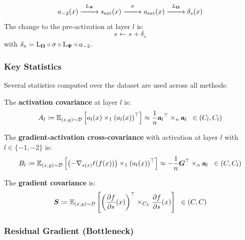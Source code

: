 \[
a_{- 2}(x) \overset{L_{\boldsymbol{\Psi}{}}}{\xrightarrow{\hspace{2em}}} s_{\text{ext}}(x) \overset{\sigma}{\xrightarrow{\hspace{2em}}} a_{\text{ext}}(x) \overset{L_{\boldsymbol{\Omega}{}}}{\xrightarrow{\hspace{2em}}} \delta_s(x)
\]
The change to the pre-activation at layer \(l\) is:
\[s_{} \leftarrow s_{} + \delta_{s_{}}\] with
\(\delta_{s_{}} = \mathrm{L}_{\boldsymbol{\Omega}{}} \circ \sigma \circ \mathrm{L}_{\boldsymbol{\Psi}{}} \circ a_{- 2}\).

\subsubsection{Key Statistics}

Several statistics computed over the dataset are used across all
methods:

\begin{definition}

The \textbf{activation covariance} at layer \(l\) is:
\[A_{l} \coloneqq \mathbb{E}_{(x,y) \sim \mathcal{D}}\left\lbrack a_{l}(x) \times_{1}\left( a_{l}(x) \right)^{\top} \right\rbrack \approx \frac{1}{n}{\mathbf{a}_{l}}^{\top} \times_{n}\mathbf{a}_{l} \;\;\in \left( C_{l},C_{l} \right)\]

\end{definition}

\begin{definition}

The \textbf{gradient-activation cross-covariance} with activation at
layer \(l\) with $l \in \{-1, -2\}$ is:
\[B_{l} \coloneqq \mathbb{E}_{(x,y) \sim \mathcal{D}}\left\lbrack \left( - {\nabla_{s(x)}\ell(f(x))} \right) \times_{1}\left( a_{l}(x) \right)^{\top} \right\rbrack \approx - \frac{1}{n}\boldsymbol{G}^{\top} \times_{n}\mathbf{a}_{l} \;\;\in \left( C,C_{l} \right)\]

\end{definition}

\begin{definition}

The \textbf{gradient covariance} is:
\[\boldsymbol{S} \coloneqq \mathbb{E}_{(x,y) \sim \mathcal{D}}\left\lbrack \left( \frac{\partial f}{\partial s_{}}(x) \right)^{\top} \times_{C_{L}}\frac{\partial f}{\partial s_{}}(x) \right\rbrack\;\; \in (C,C)\]

\end{definition}

\subsubsection{Residual Gradient (Bottleneck)}


